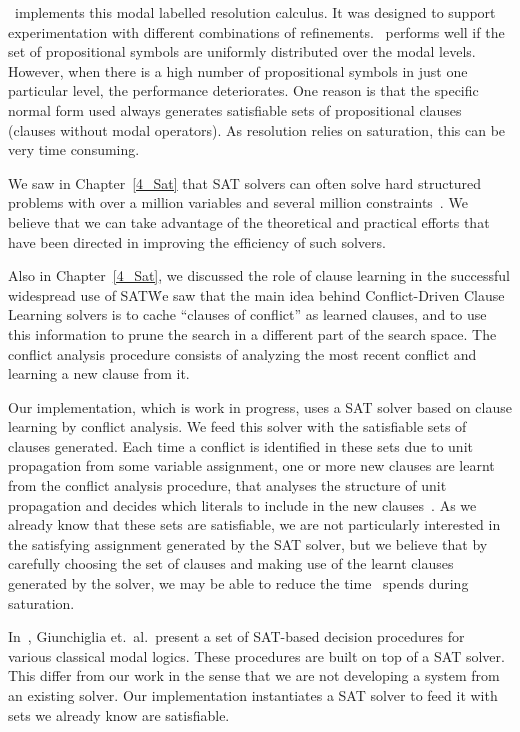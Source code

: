 \ksp~implements this modal labelled resolution calculus. It was designed to
support experimentation with different combinations of refinements.
\ksp~performs well if the set of propositional symbols are uniformly distributed
over the modal levels. However, when there is a high number of propositional
symbols in just one particular level, the performance deteriorates. One reason
is that the specific normal form used always generates satisfiable sets of
propositional clauses (clauses without modal operators). As resolution relies on
saturation, this can be very time consuming. 

We saw in Chapter~\ref{4_Sat} that SAT solvers can often solve hard structured
problems with over a million variables and several million
constraints~\cite{satchapter}. We believe that we can take advantage of the
theoretical and practical efforts that have been directed in improving the
efficiency of such solvers. 

Also in Chapter~\ref{4_Sat}, we discussed the role of clause learning in the
successful widespread use of SAT\. We saw that the main idea behind
Conflict-Driven Clause Learning solvers is to cache ``clauses of conflict'' as
learned clauses, and to use this information to prune the search in a different
part of the search space. The conflict analysis procedure consists of analyzing
the most recent conflict and learning a new clause from it.

Our implementation, which is work in progress, uses a SAT solver based on clause
learning by conflict analysis. We feed this solver with the satisfiable sets of
clauses generated. Each time a conflict is identified in these sets due to unit
propagation from some variable assignment, one or more new clauses are learnt
from the conflict analysis procedure, that analyses the structure of unit
propagation and decides which literals to include in the new
clauses~\cite{cdclchapter}. As we already know that these sets are satisfiable,
we are not particularly interested in the satisfying assignment generated by the
SAT solver, but we believe that by carefully choosing the set of clauses and
making use of the learnt clauses generated by the solver, we may be able to
reduce the time \ksp~spends during saturation. 


In~\cite{giunchiglia2002sat}, Giunchiglia et.\ al.\ present a set of SAT-based
decision procedures for various classical modal logics. These procedures are
built on top of a SAT solver. This differ from our work in the sense that we are
not developing a system from an existing solver. Our implementation instantiates
a SAT solver to feed it with sets we already know are satisfiable.

